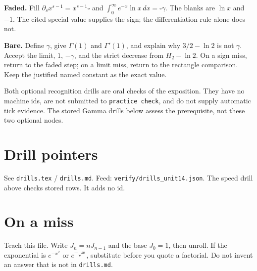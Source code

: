 \textbf{Faded.} Fill $\partial_s x^{s-1}=x^{s-1}\square$ and $\int_0^\infty e^{-x}\ln x\,dx=\square\gamma$. The blanks are $\ln x$ and $-1$. The cited special value supplies the sign; the differentiation rule alone does not.

\textbf{Bare.} Define $\gamma$, give $\Gamma(1)$ and $\Gamma'(1)$, and explain why $3/2-\ln2$ is not $\gamma$. Accept the limit, $1$, $-\gamma$, and the strict decrease from $H_2-\ln2$. On a sign miss, return to the faded step; on a limit miss, return to the rectangle comparison. Keep the justified named constant as the exact value.

Both optional recognition drills are oral checks of the exposition. They have no machine ids, are not submitted to \texttt{practice check}, and do not supply automatic tick evidence. The stored Gamma drills below assess the prerequisite, not these two optional nodes.

\section{Drill pointers}
See \texttt{drills.tex} / \texttt{drills.md}. Feed: \texttt{verify/drills\_unit14.json}. The speed drill above checks stored rows. It adds no id.

\section*{On a miss}
Teach this file. Write $J_n=n J_{n-1}$ and the base $J_0=1$, then unroll. If the exponential is $e^{-x^2}$ or $e^{-\sqrt x}$, substitute before you quote a factorial. Do not invent an answer that is not in \texttt{drills.md}.

